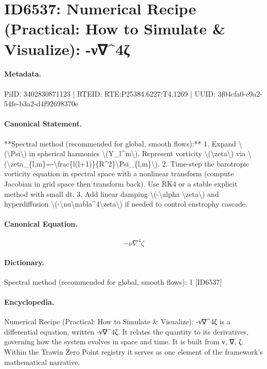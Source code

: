 \section*{ID6537: Numerical Recipe (Practical: How to Simulate \& Visualize): -ν∇\textasciicircum{}4ζ}
\paragraph{Metadata.}
PiID: 3402830871123 | RTEID: RTE:P25384.6227:T4.1269 | UUID: 3f04cfa0-e9a2-54fe-b3a2-d4f92698370e

\paragraph{Canonical Statement.}
**Spectral method (recommended for global, smooth flows):** 1. Expand \textbackslash{}(\textbackslash{}Psi\textbackslash{}) in spherical harmonics \textbackslash{}(Y\_l\textasciicircum{}m\textbackslash{}). Represent vorticity \textbackslash{}(\textbackslash{}zeta\textbackslash{}) via \textbackslash{}(\textbackslash{}zeta\_\{l,m\}=-\textbackslash{}frac\{l(l+1)\}\{R\textasciicircum{}2\}\textbackslash{}Psi\_\{l,m\}\textbackslash{}). 2. Time-step the barotropic vorticity equation in spectral space with a nonlinear transform (compute Jacobian in grid space then transform back). Use RK4 or a stable explicit method with small dt. 3. Add linear damping \textbackslash{}(-\textbackslash{}alpha \textbackslash{}zeta\textbackslash{}) and hyperdiffusion \textbackslash{}(-\textbackslash{}nu\textbackslash{}nabla\textasciicircum{}4\textbackslash{}zeta\textbackslash{}) if needed to control enstrophy cascade.

\paragraph{Canonical Equation.}
\[
-\nu\nabla^4\zeta
\]

\paragraph{Dictionary.}
Spectral method (recommended for global, smooth flows): 1 [ID6537]

\paragraph{Encyclopedia.}
Numerical Recipe (Practical: How to Simulate \& Visualize): -ν∇\textasciicircum{}4ζ is a differential equation, written -ν∇\textasciicircum{}4ζ. It relates the quantity to its derivatives, governing how the system evolves in space and time. It is built from ν, ∇, ζ. Within the Trawin Zero Point registry it serves as one element of the framework's mathematical narrative.
